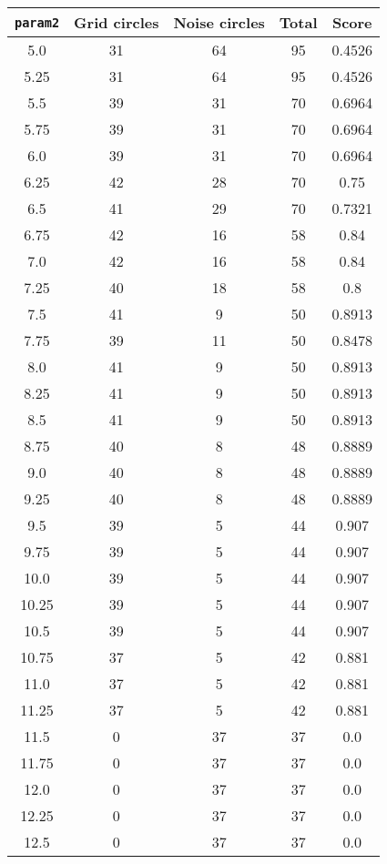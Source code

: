 \documentclass[letterpaper, 12pt]{article}
\begin{document}
\begin{longtable}{|c|c|c|c|c|}
\hline
\textbf{\texttt{param2}} & \textbf{Grid circles} & \textbf{Noise circles} & \textbf{Total} & \textbf{Score} \\
\hline
5.0 & 31 & 64 & 95 & 0.4526 \\
\hline
5.25 & 31 & 64 & 95 & 0.4526 \\
\hline
5.5 & 39 & 31 & 70 & 0.6964 \\
\hline
5.75 & 39 & 31 & 70 & 0.6964 \\
\hline
6.0 & 39 & 31 & 70 & 0.6964 \\
\hline
6.25 & 42 & 28 & 70 & 0.75 \\
\hline
6.5 & 41 & 29 & 70 & 0.7321 \\
\hline
6.75 & 42 & 16 & 58 & 0.84 \\
\hline
7.0 & 42 & 16 & 58 & 0.84 \\
\hline
7.25 & 40 & 18 & 58 & 0.8 \\
\hline
7.5 & 41 & 9 & 50 & 0.8913 \\
\hline
7.75 & 39 & 11 & 50 & 0.8478 \\
\hline
8.0 & 41 & 9 & 50 & 0.8913 \\
\hline
8.25 & 41 & 9 & 50 & 0.8913 \\
\hline
8.5 & 41 & 9 & 50 & 0.8913 \\
\hline
8.75 & 40 & 8 & 48 & 0.8889 \\
\hline
9.0 & 40 & 8 & 48 & 0.8889 \\
\hline
9.25 & 40 & 8 & 48 & 0.8889 \\
\hline
9.5 & 39 & 5 & 44 & 0.907 \\
\hline
9.75 & 39 & 5 & 44 & 0.907 \\
\hline
10.0 & 39 & 5 & 44 & 0.907 \\
\hline
10.25 & 39 & 5 & 44 & 0.907 \\
\hline
10.5 & 39 & 5 & 44 & 0.907 \\
\hline
10.75 & 37 & 5 & 42 & 0.881 \\
\hline
11.0 & 37 & 5 & 42 & 0.881 \\
\hline
11.25 & 37 & 5 & 42 & 0.881 \\
\hline
11.5 & 0 & 37 & 37 & 0.0 \\
\hline
11.75 & 0 & 37 & 37 & 0.0 \\
\hline
12.0 & 0 & 37 & 37 & 0.0 \\
\hline
12.25 & 0 & 37 & 37 & 0.0 \\
\hline
12.5 & 0 & 37 & 37 & 0.0 \\

\end{longtable}
\end{document}
